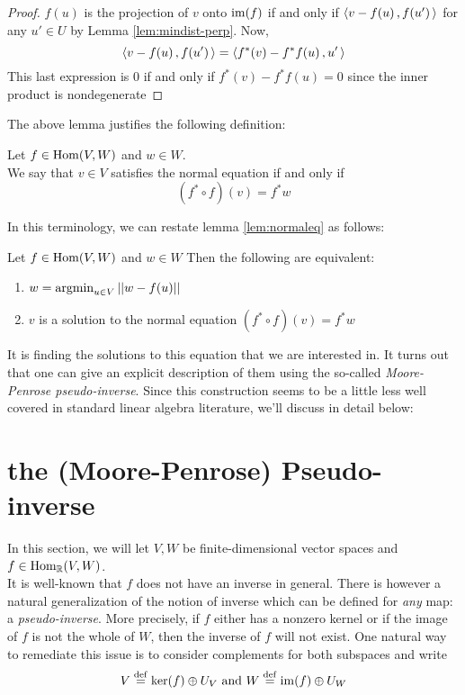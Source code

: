 \documentclass{dsp}
\begin{document}
\begin{proof}
	$f(u)$ is the projection of $v$ onto $\operatorname{im}(f)$ if and only if $\left\langle v-f(u)\,,f(u')\, \right\rangle$ for any $u' \in U$ by Lemma \ref{lem:mindist-perp}. Now,
	\[
	\left\langle v-f(u)\,,f(u')\, \right\rangle=\left\langle f^*(v)-f^*f(u)\,,u'\, \right\rangle
	\]
	This last expression is $0$ if and only if $f^*(v)-f^*f(u)=0$ since the inner product is nondegenerate
\end{proof}

The above lemma justifies the following definition:

\begin{definition}
	Let $f \in \operatorname{Hom}(V,W)$ and $w \in W$.\\ 
	We say that $v \in V$ satisfies the normal equation if and only if 
	\[
	(f^* \circ f)(v) = f^* w
	\]
\end{definition}
In this terminology, we can restate lemma \ref{lem:normaleq} as follows:
\begin{lemma}
	Let $f \in \operatorname{Hom}(V,W)$ and $w \in W$ Then the following are equivalent:
	\begin{enumerate}
		\item $w =\operatorname{argmin}_{u \in V}\vert \vert w-f(u)\vert \vert$
		\item $v$ is a solution to the normal equation $(f^* \circ f)(v) = f^* w$
	\end{enumerate}
\end{lemma}
\noindent It is finding the solutions to this equation that we are interested in. It turns out that one can give an explicit description of them using the so-called \emph{Moore-Penrose pseudo-inverse}. Since this construction seems to be a little less well covered in standard linear algebra literature, we'll discuss in detail below: 
\section{the (Moore-Penrose) Pseudo-inverse}

In this section, we will let $V, W$ be finite-dimensional vector spaces and $f \in \operatorname{Hom}_{\mathbb{R}}(V,W)$.\\ It is well-known that $f$ does not have an inverse in general. There is however a natural generalization of the notion of inverse which can be defined for \emph{any} map: a \emph{pseudo-inverse}. More precisely, if $f$ either has  a nonzero kernel or if the image of $f$ is not the whole of $W$, then the inverse of $f$ will not exist. One natural way to remediate this issue is to consider complements for both subspaces and write 
\[V\stackrel{\operatorname{def}}{=} \ker(f)\oplus U_V \textrm{ and } W\stackrel{\operatorname{def}}{=} \operatorname{im}(f)\oplus U_W\]
\end{document}
